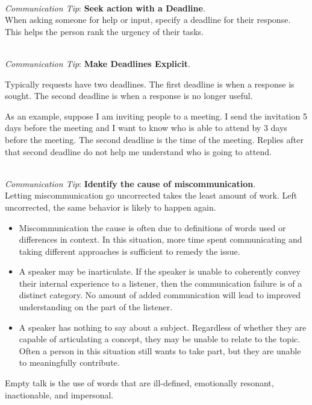 \ \\
\textit{Communication Tip}: \textbf{Seek action with a Deadline}.\\
When asking someone for help or input, specify a deadline for their response. 
This helps the person rank the urgency of their tasks.

\ \\
\textit{Communication Tip}: \textbf{Make Deadlines Explicit}.

Typically requests have two deadlines. The first deadline is when a response is sought. The second deadline is when a response is no longer useful.  

As an example, suppose I am inviting people to a meeting. I send the invitation 5 days before the meeting and I want to know who is able to attend by 3 days before the meeting. The second deadline is the time of the meeting. Replies after that second deadline do not help me understand who is going to attend. 

\ \\
\textit{Communication Tip}: \textbf{Identify the cause of miscommunication}.\\
Letting miscommunication go uncorrected takes the least amount of work. Left uncorrected, the same behavior is likely to happen again. 

\begin{itemize}
    \item Miscommunication the cause is often due to definitions of words used or differences in context. In this situation, more time spent communicating and taking different approaches is sufficient to remedy the issue.
\item A speaker may be inarticulate. If the speaker is unable to coherently convey their internal experience to a listener, then the communication failure is of a distinct category. No amount of added communication will lead to improved understanding on the part of the listener.
\item A speaker has nothing to say about a subject. Regardless of whether they are capable of articulating a concept, they may be unable to relate to the topic. Often a person in this situation still wants to take part, but they are unable to meaningfully contribute. 
\end{itemize}
Empty talk is the use of words that are ill-defined, emotionally resonant, inactionable, and impersonal.

